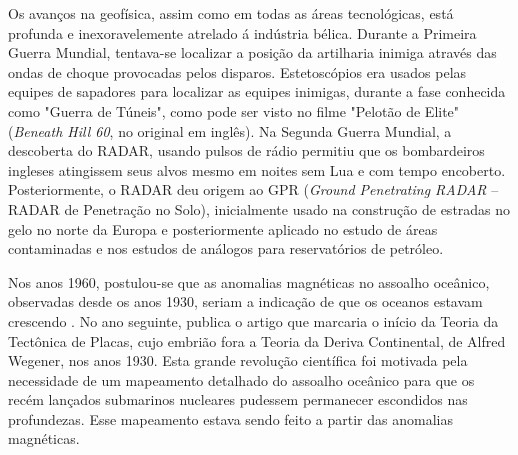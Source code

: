 \documentclass[a4paper,11pt]{scrbook}
\begin{document}
Os avan\c{c}os na geof\'isica, assim como em todas as \'areas tecnol\'ogicas, est\'a profunda e inexoravelemente atrelado \'a ind\'ustria b\'elica.
Durante a Primeira Guerra Mundial, tentava-se localizar a posi\c{c}\~ao da artilharia inimiga atrav\'es das ondas de choque provocadas pelos disparos.
Estetosc\'opios era usados pelas equipes de sapadores para localizar as equipes inimigas, durante a fase conhecida como "Guerra de T\'uneis", como pode ser visto no filme "Pelot\~ao de Elite" \citep{sims_2010} (\emph{Beneath Hill 60}, no original em ingl\^es).
Na Segunda Guerra Mundial, a descoberta do RADAR, usando pulsos de r\'adio permitiu que os bombardeiros ingleses atingissem seus alvos mesmo em noites sem Lua e com tempo encoberto.
Posteriormente, o RADAR deu origem ao GPR (\emph{Ground Penetrating RADAR} -- RADAR de Penetra\c{c}\~ao no Solo), inicialmente usado na constru\c{c}\~ao de estradas no gelo no norte da Europa e posteriormente aplicado no estudo de \'areas contaminadas e nos estudos de an\'alogos para reservat\'orios de petr\'oleo.

Nos anos 1960, postulou-se que as anomalias magn\'eticas no assoalho oce\^anico, observadas desde os anos 1930, seriam a indica\c{c}\~ao de que os oceanos estavam crescendo \citep{vine_1965}. 
No ano seguinte, \citeauthor{wilson_1966} publica o artigo que marcaria o in\'icio da Teoria da Tect\^onica de Placas, cujo embri\~ao fora a Teoria da Deriva Continental, de Alfred Wegener, nos anos 1930.
Esta grande revolu\c{c}\~ao cient\'ifica foi motivada pela necessidade de um mapeamento detalhado do assoalho oce\^anico para que os rec\'em lan\c{c}ados submarinos nucleares pudessem permanecer escondidos nas profundezas.
Esse mapeamento estava sendo feito a partir das anomalias magn\'eticas.





\end{document}
